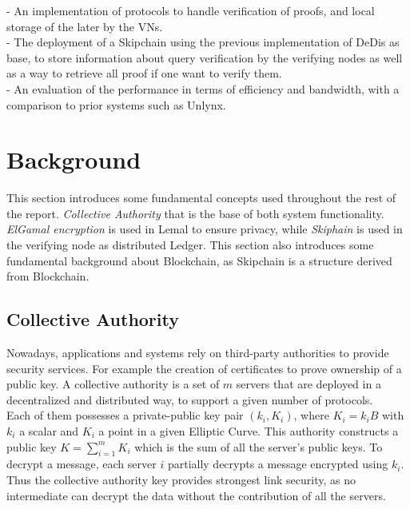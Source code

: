 \documentclass{article}
\begin{document}
- An implementation of protocols to handle verification of proofs, and local storage of the later by the VNs.\\


- The deployment of a Skipchain using the previous implementation of DeDis as base, to store information about query verification by the verifying nodes as well as a way to retrieve all proof if one want to verify them.\\


- An evaluation of the performance in terms of efficiency and bandwidth, with a comparison to prior systems such as Unlynx.\\
\section{Background}
This section introduces some fundamental concepts used throughout the rest of the report. \textit{Collective Authority} that is the base of both system functionality. \textit{ElGamal encryption} is used in Lemal to ensure privacy, while \textit{Skiphain} is used in the verifying node as distributed Ledger. This section also introduces some fundamental background about Blockchain, as Skipchain is a structure derived from Blockchain.

\subsection{Collective Authority}
Nowadays, applications and systems rely on third-party authorities to provide security services. For example the creation of certificates to prove ownership of a public key. A collective authority is a set of $m$  servers that are deployed in a decentralized and distributed way, to support a given number of protocols.\\
Each of them possesses a private-public key pair $(k_i,K_i)$, where $K_i = k_i B$ with $k_i$ a scalar and $K_i$ a point in a given Elliptic Curve. This authority constructs a public key $K = \sum_{i=1}^{m}{K_i}$ which is the sum of all the server's public keys. To decrypt a message, each server $i$ partially decrypts a message encrypted using $k_{i}$. Thus the collective authority key provides strongest link security, as no intermediate can decrypt the data without the contribution of all the servers.
\end{document}
